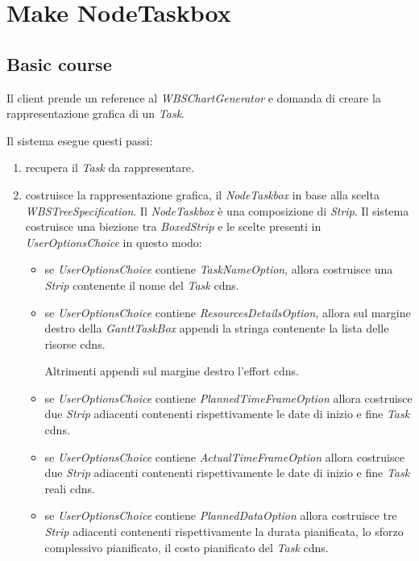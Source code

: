 \section{Make NodeTaskbox}
\label{seq:makeNodeTaskbox}
\subsection{Basic course}
Il client prende un reference al \emph{WBSChartGenerator} e domanda di creare la
rappresentazione grafica di un \emph{Task}.

Il sistema esegue questi passi:
\begin{enumerate}
  \item recupera il \emph{Task} da rappresentare.
  \item costruisce la rappresentazione grafica, il \emph{NodeTaskbox}
    in base alla scelta \emph{WBSTreeSpecification}. Il \emph{NodeTaskbox} \`e
    una composizione di \emph{Strip}. Il sistema costruisce una
    biezione tra \emph{BoxedStrip} e le scelte presenti in 
    \emph{UserOptionsChoice} in questo modo:
    \begin{itemize}
      \item se \emph{UserOptionsChoice} contiene
      \emph{TaskNameOption}, allora costruisce una
      \emph{Strip} contenente il nome del \emph{Task} cdns.
      
   	  \item se \emph{UserOptionsChoice} contiene \emph{ResourcesDetailsOption},
    	allora sul margine destro della \emph{GanttTaskBox} appendi la stringa
    	contenente la lista delle risorse cdns.
    	
    	Altrimenti appendi sul margine destro l'effort cdns.
      
      \item	se \emph{UserOptionsChoice} contiene \emph{PlannedTimeFrameOption} 
     allora costruisce due \emph{Strip} adiacenti contenenti rispettivamente le
     date di inizio e fine \emph{Task} cdns.
    	
    	\item se \emph{UserOptionsChoice} contiene \emph{ActualTimeFrameOption}
    	allora costruisce due \emph{Strip} adiacenti contenenti rispettivamente 
    	le date di inizio e fine \emph{Task} reali cdns.
    	
    	\item se \emph{UserOptionsChoice} contiene \emph{PlannedDataOption} allora
    	costruisce tre \emph{Strip} adiacenti contenenti rispettivamente la durata
    	pianificata, lo sforzo complessivo pianificato, il costo
    	pianificato del \emph{Task} cdns.
    	

\end{itemize}
\end{enumerate}
